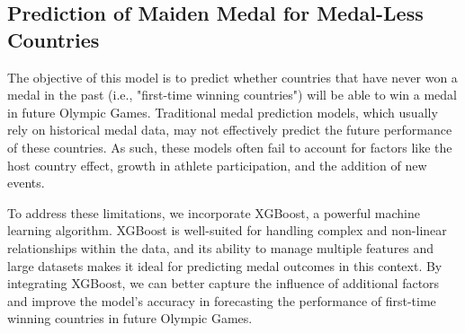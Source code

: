 \documentclass{mcmthesis}
\begin{document}
%



\subsection{ Prediction of Maiden Medal for Medal-Less Countries}
The objective of this model is to predict whether countries that have never won a medal in the past (i.e., "first-time winning countries") will be able to win a medal in future Olympic Games. Traditional medal prediction models, which usually rely on historical medal data, may not effectively predict the future performance of these countries. As such, these models often fail to account for factors like the host country effect, growth in athlete participation, and the addition of new events. 

To address these limitations, we incorporate XGBoost, a powerful machine learning algorithm. XGBoost is well-suited for handling complex and non-linear relationships within the data, and its ability to manage multiple features and large datasets makes it ideal for predicting medal outcomes in this context. By integrating XGBoost, we can better capture the influence of additional factors and improve the model's accuracy in forecasting the performance of first-time winning countries in future Olympic Games.
\end{document}
